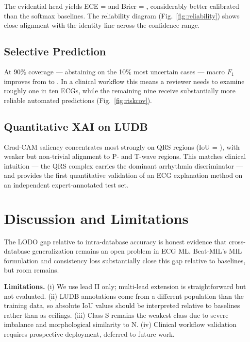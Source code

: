 \documentclass[conference]{IEEEtran}
\begin{document}


The evidential head yields ECE = \unskip{} and Brier = \unskip{}, considerably better calibrated than the softmax baselines. The reliability diagram (Fig.~\ref{fig:reliability}) shows close alignment with the identity line across the confidence range.

\subsection{Selective Prediction}



At 90\% coverage --- abstaining on the 10\% most uncertain cases --- macro $F_1$ improves from \unskip{} to \unskip{}. In a clinical workflow this means a reviewer needs to examine roughly one in ten ECGs, while the remaining nine receive substantially more reliable automated predictions (Fig.~\ref{fig:riskcov}).

\subsection{Quantitative XAI on LUDB}



Grad-CAM saliency concentrates most strongly on QRS regions (IoU = \unskip{}), with weaker but non-trivial alignment to P- and T-wave regions. This matches clinical intuition --- the QRS complex carries the dominant arrhythmia discriminator --- and provides the first quantitative validation of an ECG explanation method on an independent expert-annotated test set.

\section{Discussion and Limitations}

The LODO gap relative to intra-database accuracy is honest evidence that cross-database generalization remains an open problem in ECG ML. Beat-MIL's MIL formulation and consistency loss substantially close this gap relative to baselines, but room remains.

\textbf{Limitations.} (i) We use lead II only; multi-lead extension is straightforward but not evaluated. (ii) LUDB annotations come from a different population than the training data, so absolute IoU values should be interpreted relative to baselines rather than as ceilings. (iii) Class S remains the weakest class due to severe imbalance and morphological similarity to N. (iv) Clinical workflow validation requires prospective deployment, deferred to future work.
\end{document}
